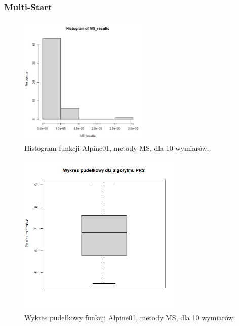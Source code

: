\documentclass{lab}
\begin{document}
\subsubsection{Multi-Start}
\begin{figure}[H]
  \centering
  \includegraphics[width=0.56\textwidth]{img/dim10_MS_Alpine01_his.png}
  \caption{Histogram funkcji Alpine01, metody MS, dla 10 wymiarów.}
\end{figure}
\begin{figure}[H]
  \centering
  \includegraphics[width=0.7\textwidth]{img/dim10_MS_Alpine01.png}
  \caption{Wykres pudełkowy funkcji Alpine01, metody MS, dla 10 wymiarów.}
\end{figure}
\end{document}
